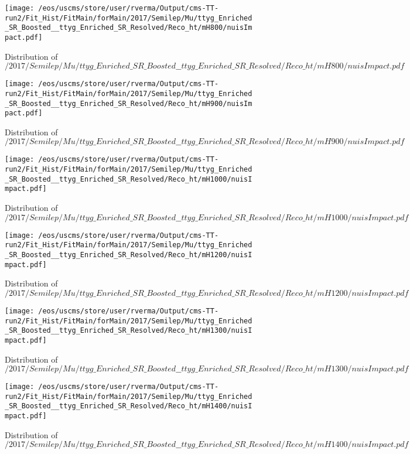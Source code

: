 \begin{figure}
\centering
\texttt{[image: /eos/uscms/store/user/rverma/Output/cms-TT-run2/Fit\_Hist/FitMain/forMain/2017/Semilep/Mu/ttyg\_Enriched\_SR\_Boosted\_\_ttyg\_Enriched\_SR\_Resolved/Reco\_ht/mH800/nuisImpact.pdf]}
\caption{Distribution of $/2017/Semilep/Mu/ttyg\_Enriched\_SR\_Boosted\_\_ttyg\_Enriched\_SR\_Resolved/Reco\_ht/mH800/nuisImpact.pdf$}
\end{figure}

\begin{figure}
\centering
\texttt{[image: /eos/uscms/store/user/rverma/Output/cms-TT-run2/Fit\_Hist/FitMain/forMain/2017/Semilep/Mu/ttyg\_Enriched\_SR\_Boosted\_\_ttyg\_Enriched\_SR\_Resolved/Reco\_ht/mH900/nuisImpact.pdf]}
\caption{Distribution of $/2017/Semilep/Mu/ttyg\_Enriched\_SR\_Boosted\_\_ttyg\_Enriched\_SR\_Resolved/Reco\_ht/mH900/nuisImpact.pdf$}
\end{figure}

\begin{figure}
\centering
\texttt{[image: /eos/uscms/store/user/rverma/Output/cms-TT-run2/Fit\_Hist/FitMain/forMain/2017/Semilep/Mu/ttyg\_Enriched\_SR\_Boosted\_\_ttyg\_Enriched\_SR\_Resolved/Reco\_ht/mH1000/nuisImpact.pdf]}
\caption{Distribution of $/2017/Semilep/Mu/ttyg\_Enriched\_SR\_Boosted\_\_ttyg\_Enriched\_SR\_Resolved/Reco\_ht/mH1000/nuisImpact.pdf$}
\end{figure}

\begin{figure}
\centering
\texttt{[image: /eos/uscms/store/user/rverma/Output/cms-TT-run2/Fit\_Hist/FitMain/forMain/2017/Semilep/Mu/ttyg\_Enriched\_SR\_Boosted\_\_ttyg\_Enriched\_SR\_Resolved/Reco\_ht/mH1200/nuisImpact.pdf]}
\caption{Distribution of $/2017/Semilep/Mu/ttyg\_Enriched\_SR\_Boosted\_\_ttyg\_Enriched\_SR\_Resolved/Reco\_ht/mH1200/nuisImpact.pdf$}
\end{figure}

\begin{figure}
\centering
\texttt{[image: /eos/uscms/store/user/rverma/Output/cms-TT-run2/Fit\_Hist/FitMain/forMain/2017/Semilep/Mu/ttyg\_Enriched\_SR\_Boosted\_\_ttyg\_Enriched\_SR\_Resolved/Reco\_ht/mH1300/nuisImpact.pdf]}
\caption{Distribution of $/2017/Semilep/Mu/ttyg\_Enriched\_SR\_Boosted\_\_ttyg\_Enriched\_SR\_Resolved/Reco\_ht/mH1300/nuisImpact.pdf$}
\end{figure}

\begin{figure}
\centering
\texttt{[image: /eos/uscms/store/user/rverma/Output/cms-TT-run2/Fit\_Hist/FitMain/forMain/2017/Semilep/Mu/ttyg\_Enriched\_SR\_Boosted\_\_ttyg\_Enriched\_SR\_Resolved/Reco\_ht/mH1400/nuisImpact.pdf]}
\caption{Distribution of $/2017/Semilep/Mu/ttyg\_Enriched\_SR\_Boosted\_\_ttyg\_Enriched\_SR\_Resolved/Reco\_ht/mH1400/nuisImpact.pdf$}
\end{figure}

